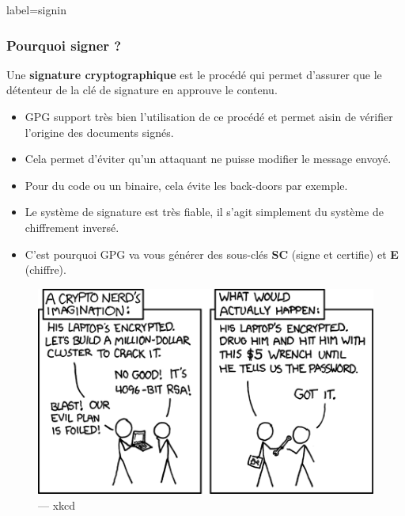 \documentclass{beamer}
\begin{document}
        \begin{frame}{label=signin}
            \frametitle{Pourquoi signer ?}
            Une \textbf{signature cryptographique} est le procédé qui permet d'assurer que le détenteur de la clé de signature en approuve le contenu.
            \begin{center}
                \begin{itemize}
                    \item GPG support très bien l'utilisation de ce procédé et permet aisin de vérifier l'origine des documents signés.
                    \item Cela permet d'éviter qu'un attaquant ne puisse modifier le message envoyé.
                    \item Pour du code ou un binaire, cela évite les back-doors par exemple.
                    \item Le système de signature est très fiable, il s'agit simplement du système de chiffrement inversé.
                    \item C'est pourquoi GPG va vous générer des sous-clés \textbf{SC} (signe et certifie) et \textbf{E} (chiffre).
                \end{itemize}
            \end{center}
        \end{frame}
        \begin{frame}
            \begin{center}
                \begin{figure}
                    \includegraphics[scale=0.60]{img/security.png}
                    \caption{\cc --- xkcd}
                \end{figure}
            \end{center}
        \end{frame}
\end{document}
